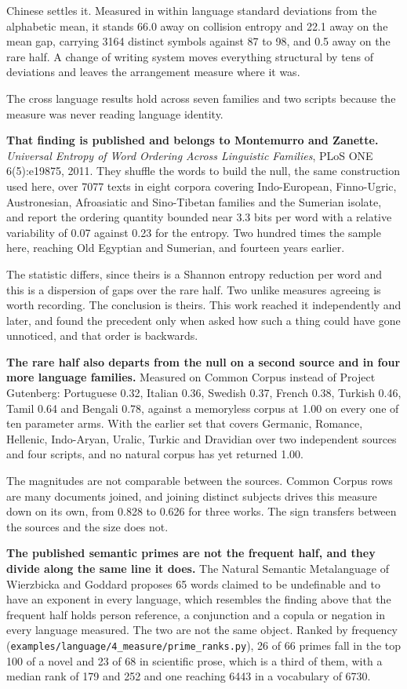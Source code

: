 Chinese settles it. Measured in within language standard deviations from the alphabetic mean, it stands 66.0 away on collision entropy and 22.1 away on the mean gap, carrying 3164 distinct symbols against 87 to 98, and 0.5 away on the rare half. A change of writing system moves everything structural by tens of deviations and leaves the arrangement measure where it was.

The cross language results hold across seven families and two scripts because the measure was never reading language identity.

\textbf{That finding is published and belongs to Montemurro and Zanette.} \emph{Universal Entropy of Word Ordering Across Linguistic Families}, PLoS ONE 6(5):e19875, 2011. They shuffle the words to build the null, the same construction used here, over 7077 texts in eight corpora covering Indo-European, Finno-Ugric, Austronesian, Afroasiatic and Sino-Tibetan families and the Sumerian isolate, and report the ordering quantity bounded near 3.3 bits per word with a relative variability of 0.07 against 0.23 for the entropy. Two hundred times the sample here, reaching Old Egyptian and Sumerian, and fourteen years earlier.

The statistic differs, since theirs is a Shannon entropy reduction per word and this is a dispersion of gaps over the rare half. Two unlike measures agreeing is worth recording. The conclusion is theirs. This work reached it independently and later, and found the precedent only when asked how such a thing could have gone unnoticed, and that order is backwards.

\textbf{The rare half also departs from the null on a second source and in four more language families.} Measured on Common Corpus instead of Project Gutenberg: Portuguese 0.32, Italian 0.36, Swedish 0.37, French 0.38, Turkish 0.46, Tamil 0.64 and Bengali 0.78, against a memoryless corpus at 1.00 on every one of ten parameter arms. With the earlier set that covers Germanic, Romance, Hellenic, Indo-Aryan, Uralic, Turkic and Dravidian over two independent sources and four scripts, and no natural corpus has yet returned 1.00.

The magnitudes are not comparable between the sources. Common Corpus rows are many documents joined, and joining distinct subjects drives this measure down on its own, from 0.828 to 0.626 for three works. The sign transfers between the sources and the size does not.

\textbf{The published semantic primes are not the frequent half, and they divide along the same line it does.} The Natural Semantic Metalanguage of Wierzbicka and Goddard proposes 65 words claimed to be undefinable and to have an exponent in every language, which resembles the finding above that the frequent half holds person reference, a conjunction and a copula or negation in every language measured. The two are not the same object. Ranked by frequency (\texttt{examples/\allowbreak{}language/\allowbreak{}4\_\allowbreak{}measure/\allowbreak{}prime\_\allowbreak{}ranks.\allowbreak{}py}), 26 of 66 primes fall in the top 100 of a novel and 23 of 68 in scientific prose, which is a third of them, with a median rank of 179 and 252 and one reaching 6443 in a vocabulary of 6730.

